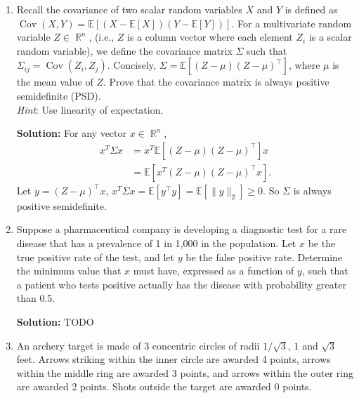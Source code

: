 \documentclass{article}
\DeclareMathOperator{\cov}{\mathrm{Cov}}
\DeclareMathOperator{\R}{\mathbb{R}}
\newenvironment{solution}{\color{blue} \smallskip \textbf{Solution:}}{}
\begin{document}
\begin{enumerate} 
    
    \item 
    Recall the covariance of two scalar random variables $X$ and $Y$ is defined as $\cov(X,Y)=\mathbb{E}[(X-\mathbb{E}[X])(Y-\mathbb{E}[Y])]$. 
    For a multivariate random variable $Z \in \R^n$, (i.e., $Z$ is a column vector where each element $Z_i$ is a scalar random variable), we define the covariance matrix $\Sigma$ such that $\Sigma_{ij}=\cov(Z_i, Z_j)$. 
    Concisely, $\Sigma=\mathbb{E}[(Z-\mu)(Z-\mu)^\top ]$, where $\mu$ is the mean value of $Z$. 
    Prove that the covariance matrix is always positive semidefinite (PSD). \\
    \emph{Hint}: Use linearity of expectation.

    \begin{solution}
        For any vector $x \in \R^n$,
        \begin{align*}
        x^T\Sigma x &= x^T\mathbb{E}[(Z-\mu)(Z-\mu)^\top] x \\
        &= \mathbb{E}[x^T(Z-\mu)(Z-\mu)^\top x].
        \end{align*} 
        Let $y=(Z-\mu)^\top x$, $x^T\Sigma x = \mathbb{E}[y^\top y] = \mathbb{E}[\|y\|_2] \geq 0$.
        So $\Sigma$ is always positive semidefinite.
        
    \end{solution}

    \item
    Suppose a pharmaceutical company is developing a diagnostic test for a rare disease that has a prevalence of 1 in 1,000 in the population. 
    Let $x$ be the true positive rate of the test, and let $y$ be the false positive rate. 
    Determine the minimum value that $x$ must have, expressed as a function of $y$, such that a patient who tests positive actually has the disease with probability greater than 0.5.

    \begin{solution}
        TODO
    \end{solution}

    \item
    An archery target is made of 3 concentric circles of radii $1/{\sqrt{3}}$, $1$ and $\sqrt{3}$ feet. 
    Arrows striking within the inner circle are awarded 4 points, arrows within the middle ring are awarded 3 points, and arrows within the outer ring are awarded 2 points. 
    Shots outside the target are awarded 0 points.


\end{enumerate}
\end{document}
